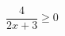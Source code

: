 \begin{ex}[type=inequality]
	\begin{condition}
		\( \dfrac{4}{2x+3}\ge0 \)
	\end{condition}
\end{ex}